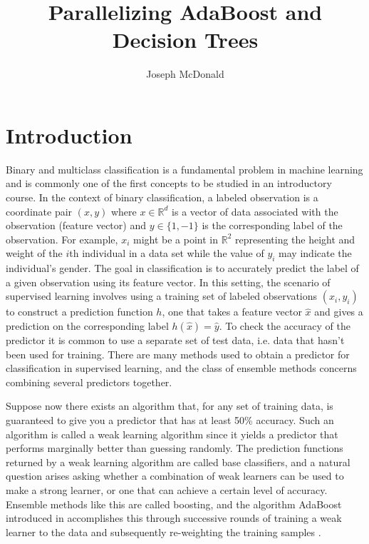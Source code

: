 \documentclass[12pt]{article}
\author{Joseph McDonald}
\title{Parallelizing AdaBoost and Decision Trees}
\begin{document}

\maketitle

\section{Introduction}

\indent Binary and multiclass classification is a fundamental
problem in machine learning and is commonly one of the first concepts to be
studied in an introductory course. In the context of binary classification, a
labeled observation is a coordinate pair $(x, y)$ where $x\in\mathbb{R}^d$ is a
vector of data associated with the observation (feature vector) and $y\in\{1,
-1\}$ is the corresponding label of the observation. For example, $x_i$ might
be a point in $\mathbb{R}^2$ representing the height and weight of the $i$th
individual in a data set while the value of $y_i$ may indicate the individual's
gender. The goal in classification is to accurately predict the label
of a given observation using its feature vector. In this setting, the scenario
of supervised learning involves using a training set of labeled observations
$(x_i, y_i)$ to construct a prediction function $h$, one that takes a feature
vector $\hat{x}$ and gives a prediction on the corresponding label
$h(\hat{x})=\hat{y}$. To check the accuracy of the predictor it is common to use a separate set of test data, i.e. data that hasn't been used for training. There are many methods used to obtain a predictor for classification in supervised
learning, and the class of ensemble methods concerns combining several
predictors together.

Suppose now there exists an algorithm that, for any set of training data, is
guaranteed to give you a predictor that has at least 50\% accuracy. Such an
algorithm is called a weak learning algorithm since it yields a predictor that
performs marginally better than guessing randomly. The prediction functions
returned by a weak learning algorithm are called base classifiers, and a
natural question arises asking whether a combination of weak learners can be used
to make a strong learner, or one that can achieve a certain level of accuracy.
Ensemble methods like this are called boosting, and the
algorithm AdaBoost introduced in \cite{no1} accomplishes this through
successive rounds of training a weak learner to the data and subsequently
re-weighting the training samples \cite{no1}.
\end{document}
